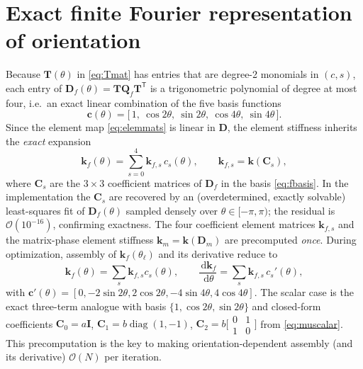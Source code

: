 \documentclass[11pt]{article}
\newcommand{\vD}{\mathbf{D}}
\newcommand{\vQ}{\mathbf{Q}}
\newcommand{\vT}{\mathbf{T}}
\newcommand{\rmd}{\,\mathrm{d}}
\newcommand{\T}{^{\mathsf{T}}}
\begin{document}
\section{Exact finite Fourier representation of orientation}
\label{sec:fourier}
Because $\vT(\theta)$ in \eqref{eq:Tmat} has entries that are degree-2 monomials
in $(c,s)$, each entry of $\vD_f(\theta)=\vT\vQ_f\vT\T$ is a trigonometric
polynomial of degree at most four, i.e.\ an exact linear combination of the five
basis functions
\begin{equation}
  \mathbf{c}(\theta)=\bigl[\,1,\ \cos2\theta,\ \sin2\theta,\ \cos4\theta,\
  \sin4\theta\,\bigr].
  \label{eq:fbasis}
\end{equation}
Since the element map \eqref{eq:elemmats} is linear in $\vD$, the element
stiffness inherits the \emph{exact} expansion
\begin{equation}
  \mathbf{k}_f(\theta)=\sum_{s=0}^{4}\mathbf{k}_{f,s}\,c_s(\theta),\qquad
  \mathbf{k}_{f,s}=\mathbf{k}\!\left(\mathbf{C}_s\right),
  \label{eq:kf}
\end{equation}
where $\mathbf{C}_s$ are the $3\times3$ coefficient matrices of $\vD_f$ in the
basis \eqref{eq:fbasis}. In the implementation the $\mathbf{C}_s$ are recovered by
an (overdetermined, exactly solvable) least-squares fit of $\vD_f(\theta)$
sampled densely over $\theta\in[-\pi,\pi)$; the residual is
$\mathcal{O}(10^{-16})$, confirming exactness. The four coefficient element
matrices $\mathbf{k}_{f,s}$ and the matrix-phase element stiffness
$\mathbf{k}_m=\mathbf{k}(\vD_m)$ are precomputed \emph{once}. During optimization,
assembly of $\mathbf{k}_f(\theta_\ell)$ and its derivative reduce to
\begin{equation}
  \mathbf{k}_f(\theta)=\sum_s\mathbf{k}_{f,s}c_s(\theta),\qquad
  \frac{\rmd\mathbf{k}_f}{\rmd\theta}=\sum_s\mathbf{k}_{f,s}\,c_s'(\theta),
  \label{eq:dkf}
\end{equation}
with $\mathbf{c}'(\theta)=[0,-2\sin2\theta,2\cos2\theta,-4\sin4\theta,
4\cos4\theta]$. The scalar case is the exact three-term analogue with basis
$\{1,\cos2\theta,\sin2\theta\}$ and closed-form coefficients $\mathbf{C}_0=a
\mathbf{I}$, $\mathbf{C}_1=b\operatorname{diag}(1,-1)$, $\mathbf{C}_2=b
\bigl[\begin{smallmatrix}0&1\\1&0\end{smallmatrix}\bigr]$ from
\eqref{eq:muscalar}. This precomputation is the key to making
orientation-dependent assembly (and its derivative) $\mathcal{O}(N)$ per
iteration.
\end{document}
